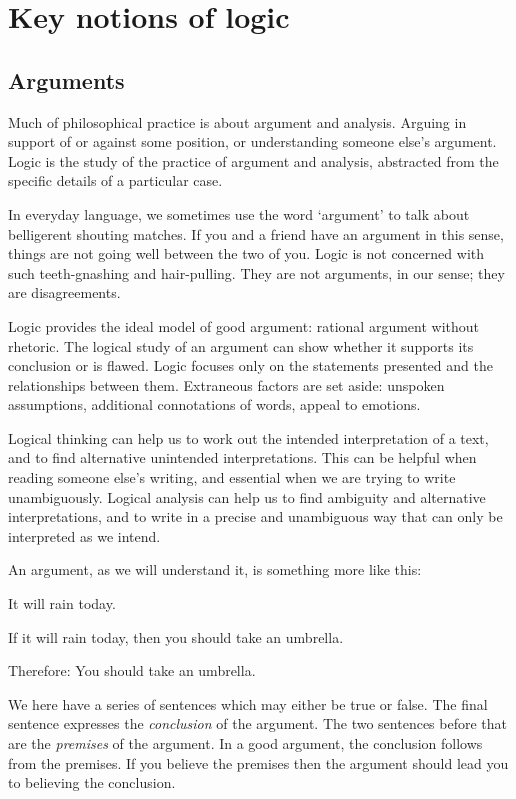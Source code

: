\part{Key notions of logic}
\label{ch.intro}


\chapter{Arguments}
\label{s:Arguments}

Much of philosophical practice is about argument and
analysis. 
Arguing in support of or against some position, or understanding someone else's argument. 
Logic is the study of the practice of argument and
analysis, abstracted from the specific details of a
particular case.



In everyday language, we sometimes use the word `argument' to talk about belligerent shouting matches.  If you and a friend have an argument in this sense, things are not going well between the two of you. Logic is not concerned with such teeth-gnashing and hair-pulling. They are not arguments, in our sense; they are disagreements.

Logic provides the ideal model of good argument:
rational argument without rhetoric.
The logical study of an argument can show whether it
supports its conclusion or is flawed.
Logic focuses only on the statements presented and the
relationships between them.
Extraneous factors are set aside: unspoken assumptions,
additional connotations of words, appeal to emotions.

 Logical thinking can help us to work out the intended
interpretation of a text, and to find alternative
unintended interpretations.
 This can be helpful when reading someone else’s
writing, and essential when we are trying to write
unambiguously.
 Logical analysis can help us to find ambiguity and
alternative interpretations, and to write in a precise and
unambiguous way that can only be interpreted as we
intend.



An argument, as we will understand it, is something more like this:
	\begin{earg}\label{argRaining}
		\item[] It will rain today.
		\item[] If it will rain today, then you should take an umbrella. 
		\item[]Therefore: You should take an umbrella.
	\end{earg}
We here have a series of sentences which may either be true or false. The final sentence expresses the \emph{conclusion} of the argument. The two sentences before that are the \emph{premises} of the argument. In a good argument, the conclusion follows from the premises. If you believe the premises then the argument should lead you to believing the conclusion.

